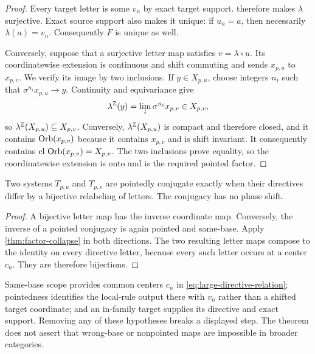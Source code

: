 \begin{proof}
  Every target letter is some $v_n$ by exact target support.
   therefore makes $\lambda$ surjective.
  Exact source support also makes it unique: if $u_n=a$, then necessarily
  $\lambda(a)=v_n$.  Consequently $F$ is unique as well.

  Conversely, suppose that a surjective letter map satisfies
  $v=\lambda\circ u$.  Its coordinatewise extension is continuous and
  shift commuting and sends $x_{p,u}$ to $x_{p,v}$.  We verify its image
  by two inclusions.  If $y\in X_{p,u}$, choose integers $n_i$ such that
  $\sigma^{n_i}x_{p,u}\to y$.  Continuity and equivariance give
  \[
    \lambda^{\mathbb Z}(y)
      =\lim_i\sigma^{n_i}x_{p,v}\in X_{p,v},
  \]
  so $\lambda^{\mathbb Z}(X_{p,u})\subseteq X_{p,v}$.  Conversely,
  $\lambda^{\mathbb Z}(X_{p,u})$ is compact and therefore closed, and it contains
  $\operatorname{Orb}(x_{p,v})$ because it contains $x_{p,v}$ and is shift invariant.
  It consequently contains $\operatorname{cl}\,\operatorname{Orb}(x_{p,v})=X_{p,v}$.  The two
  inclusions prove equality, so the coordinatewise extension is onto and
  is the required pointed factor.
\end{proof}

\begin{corollary}
\label{cor:pointed-conjugacy}
  Two systems $T_{p,u}$ and $T_{p,v}$ are pointedly conjugate exactly when
  their directives differ by a bijective relabeling of letters.  The
  conjugacy has no phase shift.
\end{corollary}

\begin{proof}
  A bijective letter map has the inverse coordinate map.  Conversely, the
  inverse of a pointed conjugacy is again pointed and same-base.  Apply
  \cref{thm:factor-collapse} in both directions.  The two resulting letter
  maps compose to the identity on every directive letter, because every
  such letter occurs at a center $c_n$.  They are therefore bijections.
\end{proof}

\begin{remark}
\label{rem:factor-scope}
  Same-base scope provides common centers $c_n$ in
  \cref{eq:large-directive-relation}; pointedness identifies the local-rule
  output there with $v_n$ rather than a shifted target coordinate; and an
  in-family target supplies its directive and exact support.  Removing any
  of these hypotheses breaks a displayed step.  The theorem does not assert
  that wrong-base or nonpointed maps are impossible in broader categories.
\end{remark}
